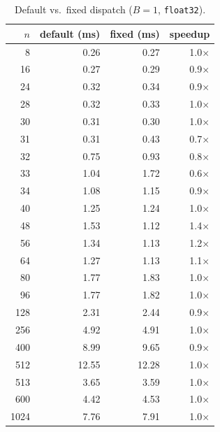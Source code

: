 \documentclass[10pt, letterpaper]{article}
\begin{document}
\begin{table}[h]
\centering
\caption{Default vs.\ fixed dispatch ($B = 1$, \texttt{float32}).}
\label{tab:f32_B1}
\begin{tabular}{r rrr}
\toprule
$n$ & default (ms) & fixed (ms) & speedup \\
\midrule
   8  & 0.26  & 0.27  & 1.0$\times$ \\
  16  & 0.27  & 0.29  & 0.9$\times$ \\
  24  & 0.32  & 0.34  & 0.9$\times$ \\
  28  & 0.32  & 0.33  & 1.0$\times$ \\
  30  & 0.31  & 0.30  & 1.0$\times$ \\
  31  & 0.31  & 0.43  & 0.7$\times$ \\
  32  & 0.75  & 0.93  & 0.8$\times$ \\
\midrule
  33  & 1.04  & 1.72  & 0.6$\times$ \\
  34  & 1.08  & 1.15  & 0.9$\times$ \\
  40  & 1.25  & 1.24  & 1.0$\times$ \\
  48  & 1.53  & 1.12  & 1.4$\times$ \\
  56  & 1.34  & 1.13  & 1.2$\times$ \\
  64  & 1.27  & 1.13  & 1.1$\times$ \\
  80  & 1.77  & 1.83  & 1.0$\times$ \\
  96  & 1.77  & 1.82  & 1.0$\times$ \\
 128  & 2.31  & 2.44  & 0.9$\times$ \\
 256  & 4.92  & 4.91  & 1.0$\times$ \\
 400  & 8.99  & 9.65  & 0.9$\times$ \\
 512  & 12.55 & 12.28 & 1.0$\times$ \\
 513  & 3.65  & 3.59  & 1.0$\times$ \\
 600  & 4.42  & 4.53  & 1.0$\times$ \\
1024  & 7.76  & 7.91  & 1.0$\times$ \\
\bottomrule
\end{tabular}
\end{table}
\end{document}
